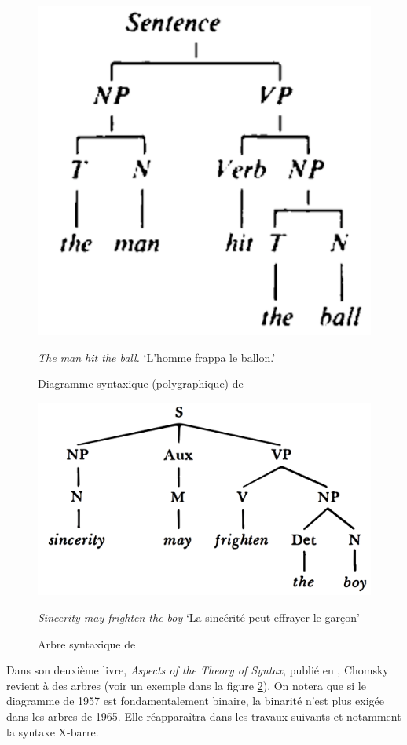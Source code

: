 {\begin{figure}[H]
    \includegraphics[width=\textwidth]{figures/vol1syntaxe2-img026.png}
    \caption{Diagramme syntaxique (polygraphique) de \citet{chomsky1957syntactic}}
    \small\textit{The man hit the ball.} ‘L'homme frappa le ballon.’\label{fig:chomsky57}
\end{figure}

\begin{figure}[H]
    \includegraphics[width=\textwidth]{figures/vol1syntaxe2-img027.png}
    \caption{Arbre syntaxique de \citet{chomsky1965aspects}\label{fig:chomsky65}}
   \small\textit{Sincerity may frighten the boy} ‘La sincérité peut effrayer le garçon’ 
\end{figure}

    Dans son deuxième livre, \textit{Aspects of the Theory of Syntax}, publié en \citeyear{chomsky1965aspects}, Chomsky revient à des arbres (voir un exemple dans la figure \ref{fig:chomsky65}). On notera que si le diagramme de 1957 est fondamentalement binaire, la binarité n’est plus exigée dans les arbres de 1965. Elle réapparaîtra dans les travaux suivants et notamment la syntaxe X-barre.
}
